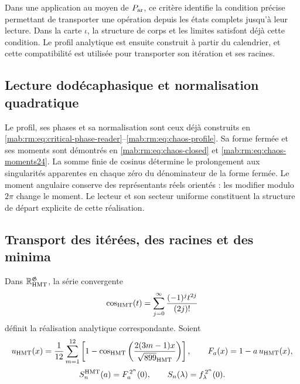 Dans une application au moyen de \(P_{\rm ar}\), ce critère identifie la condition précise permettant de transporter une opération depuis les états complets jusqu’à leur lecture. Dans la carte \(\iota\), la structure de corps et les limites satisfont déjà cette condition. Le profil analytique est ensuite construit à partir du calendrier, et cette compatibilité est utilisée pour transporter son itération et ses racines.

\subsection{Lecture dodécaphasique et normalisation quadratique}
\label{hmtfg:perfil-dodecafasico}

Le profil, ses phases et sa normalisation sont ceux déjà construits en \eqref{mab:rm:eq:critical-phase-reader}--\eqref{mab:rm:eq:chaos-profile}. Sa forme fermée et ses moments sont démontrés en \eqref{mab:rm:eq:chaos-closed} et \eqref{mab:rm:eq:chaos-moments24}. La somme finie de cosinus détermine le prolongement aux singularités apparentes en chaque zéro du dénominateur de la forme fermée. Le moment angulaire conserve des représentants réels orientés : les modifier modulo $2\pi$ change le moment. Le lecteur et son secteur uniforme constituent la structure de départ explicite de cette réalisation.

\subsection{Transport des itérées, des racines et des minima}
\label{hmtfg:transporte-raices}

Dans \(\mathbb R_{\rm HMT}^{\mathfrak G}\), la série convergente
\[
 \cos_{\rm HMT}(t)=\sum_{j=0}^{\infty}
                   \frac{(-1)^j t^{2j}}{(2j)!}
\]
définit la réalisation analytique correspondante. Soient
\[
 u_{\rm HMT}(x)=\frac1{12}\sum_{m=1}^{12}
  \left[1-\cos_{\rm HMT}
   \left(\frac{2(3m-1)x}{\sqrt{899}_{\rm HMT}}\right)\right],
 \qquad F_a(x)=1-a\,u_{\rm HMT}(x),
\]
\[
 S_n^{\rm HMT}(a)=F_a^{\,2^n}(0),\qquad
 S_n(\lambda)=f_\lambda^{\,2^n}(0).
\]

